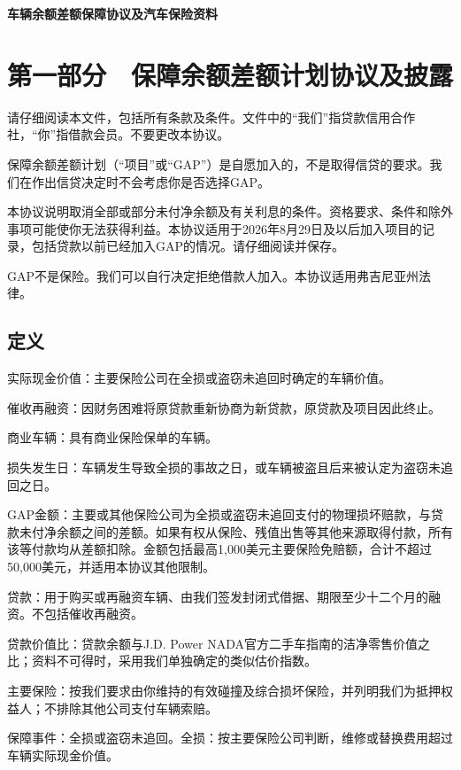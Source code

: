 \documentclass[UTF8,fontset=none,11pt,a4paper]{ctexart}
\begin{document}
{\noindent\LARGE\bfseries 车辆余额差额保障协议及汽车保险资料\par}
\vspace{10pt}
\section*{第一部分　保障余额差额计划协议及披露}
请仔细阅读本文件，包括所有条款及条件。文件中的“我们”指贷款信用合作社，“你”指借款会员。不要更改本协议。


保障余额差额计划（“项目”或“GAP”）是自愿加入的，不是取得信贷的要求。我们在作出信贷决定时不会考虑你是否选择GAP。


本协议说明取消全部或部分未付净余额及有关利息的条件。资格要求、条件和除外事项可能使你无法获得利益。本协议适用于2026年8月29日及以后加入项目的记录，包括贷款以前已经加入GAP的情况。请仔细阅读并保存。


GAP不是保险。我们可以自行决定拒绝借款人加入。本协议适用弗吉尼亚州法律。


\subsection*{定义}
实际现金价值：主要保险公司在全损或盗窃未追回时确定的车辆价值。


催收再融资：因财务困难将原贷款重新协商为新贷款，原贷款及项目因此终止。


商业车辆：具有商业保险保单的车辆。


损失发生日：车辆发生导致全损的事故之日，或车辆被盗且后来被认定为盗窃未追回之日。


GAP金额：主要或其他保险公司为全损或盗窃未追回支付的物理损坏赔款，与贷款未付净余额之间的差额。如果有权从保险、残值出售等其他来源取得付款，所有该等付款均从差额扣除。金额包括最高1,000美元主要保险免赔额，合计不超过50,000美元，并适用本协议其他限制。


贷款：用于购买或再融资车辆、由我们签发封闭式借据、期限至少十二个月的融资。不包括催收再融资。


贷款价值比：贷款余额与J.D. Power NADA官方二手车指南的洁净零售价值之比；资料不可得时，采用我们单独确定的类似估价指数。


主要保险：按我们要求由你维持的有效碰撞及综合损坏保险，并列明我们为抵押权益人；不排除其他公司支付车辆索赔。


保障事件：全损或盗窃未追回。全损：按主要保险公司判断，维修或替换费用超过车辆实际现金价值。
\end{document}
